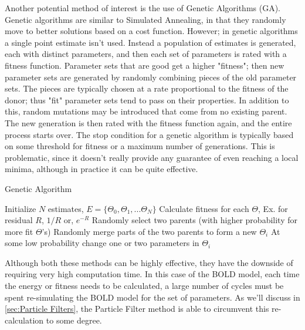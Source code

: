 
Another potential method of interest is the use of Genetic Algorithms
(GA). Genetic algorithms are similar to Simulated Annealing, in
that they randomly move to better solutions based on a cost function.
However; in genetic algorithms a single point estimate isn't used. Instead
a population of estimates is generated, each with distinct parameters,
and then each set of parameters is rated with a fitness function. Parameter
sets that are good get a higher "fitness"; then new parameter sets are generated by 
randomly combining pieces of the old parameter sets. The pieces are typically
chosen at a rate proportional to the fitness of the donor; thus "fit"
parameter sets tend to pass on their properties. In addition to this,
random mutations may be introduced that come from no existing parent. 
The new generation is then rated with the fitness function again, and
the entire process starts over. The stop condition for a genetic algorithm
is typically based on some threshold for fitness or a maximum number 
of generations. This is problematic, since it doesn't really provide 
any guarantee of even reaching a local minima, although in practice
it can be quite effective.


\begin{algorithm}
\caption{Genetic Algorithm}
\label{alg:Genetic Algorithm}
\begin{algorithmic}
\STATE Initialize $N$ estimates, $E = \{\Theta_0, \Theta_1, ... \Theta_N\}$
    \STATE Calculate fitness for each $\Theta$, Ex. for residual $R$, $1/R$ or, $e^{-R}$
        \STATE Randomly select two parents (with higher probability for more fit $\Theta$'s)
        \STATE Randomly merge parts of the two parents to form a new $\Theta_i$
        \STATE At some low probability change one or two parameters in $\Theta_i$
    \ENDFOR
\ENDFOR
\end{algorithmic}
\end{algorithm}

Although both these methods can be highly effective, they have the downside of
requiring very high computation time. In this case of the BOLD model,
each time the energy or fitness needs to be calculated, a large number of cycles
must be spent re-simulating the BOLD model for the set of parameters. As we'll
discuss in \autoref{sec:Particle Filters}, the Particle Filter method is able
to circumvent this re-calculation to some degree.

